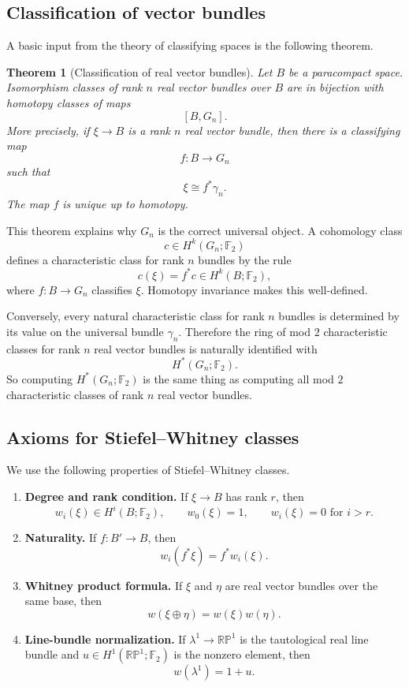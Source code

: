 \documentclass[11pt]{article}
\newtheorem{theorem}{Theorem}[section]
\theoremstyle{remark}
\newcommand{\F}{\mathbb F}
\newcommand{\RP}{\mathbb{RP}}
\newcommand{\Gn}{G_n}
\newcommand{\gamman}{\gamma_n}
\begin{document}
\subsection{Classification of vector bundles}

A basic input from the theory of classifying spaces is the following theorem.

\begin{theorem}[Classification of real vector bundles]
Let $B$ be a paracompact space.  Isomorphism classes of rank $n$ real vector bundles over $B$ are in bijection with homotopy classes of maps
\[
  [B,\Gn].
\]
More precisely, if $\xi\to B$ is a rank $n$ real vector bundle, then there is a classifying map
\[
  f:B\to \Gn
\]
such that
\[
  \xi\cong f^*\gamman.
\]
The map $f$ is unique up to homotopy.
\end{theorem}

This theorem explains why $\Gn$ is the correct universal object.  A cohomology class
\[
  c\in H^k(\Gn;\F_2)
\]
defines a characteristic class for rank $n$ bundles by the rule
\[
  c(\xi)=f^*c\in H^k(B;\F_2),
\]
where $f:B\to \Gn$ classifies $\xi$.  Homotopy invariance makes this well-defined.

Conversely, every natural characteristic class for rank $n$ bundles is determined by its value on the universal bundle $\gamman$.  Therefore the ring of mod $2$ characteristic classes for rank $n$ real vector bundles is naturally identified with
\[
  H^*(\Gn;\F_2).
\]
So computing $H^*(\Gn;\F_2)$ is the same thing as computing all mod $2$ characteristic classes of rank $n$ real vector bundles.

\subsection{Axioms for Stiefel--Whitney classes}

We use the following properties of Stiefel--Whitney classes.

\begin{enumerate}
\item \textbf{Degree and rank condition.}  If $\xi\to B$ has rank $r$, then
\[
  w_i(\xi)\in H^i(B;\F_2),\qquad w_0(\xi)=1,
  \qquad w_i(\xi)=0\text{ for }i>r.
\]

\item \textbf{Naturality.}  If $f:B'\to B$, then
\[
  w_i(f^*\xi)=f^*w_i(\xi).
\]

\item \textbf{Whitney product formula.}  If $\xi$ and $\eta$ are real vector bundles over the same base, then
\[
  w(\xi\oplus\eta)=w(\xi)w(\eta).
\]

\item \textbf{Line-bundle normalization.}  If $\lambda^1\to \RP^1$ is the tautological real line bundle and $u\in H^1(\RP^1;\F_2)$ is the nonzero element, then
\[
  w(\lambda^1)=1+u.
\]
\end{enumerate}
\end{document}
